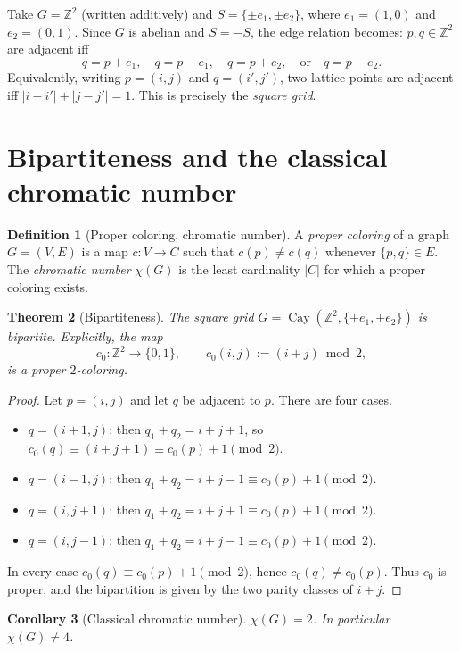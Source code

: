 \documentclass[11pt]{article}
\newtheorem{theorem}{Theorem}
\newtheorem{corollary}[theorem]{Corollary}
\theoremstyle{definition}
\newtheorem{definition}[theorem]{Definition}
\begin{document}
Take $G=\mathbb{Z}^2$ (written additively) and $S=\{\pm e_1,\pm e_2\}$, where
$e_1=(1,0)$ and $e_2=(0,1)$. Since $G$ is abelian and $S=-S$, the edge relation
becomes: $p,q\in\mathbb{Z}^2$ are adjacent iff
\[
q=p+e_1,\quad q=p-e_1,\quad q=p+e_2,\quad\text{or}\quad q=p-e_2.
\]
Equivalently, writing $p=(i,j)$ and $q=(i',j')$, two lattice points are adjacent
iff $|i-i'|+|j-j'|=1$. This is precisely the \emph{square grid}.

\section{Bipartiteness and the classical chromatic number}

\begin{definition}[Proper coloring, chromatic number]
A \emph{proper coloring} of a graph $G=(V,E)$ is a map $c\colon V\to C$ such
that $c(p)\neq c(q)$ whenever $\{p,q\}\in E$. The \emph{chromatic number}
$\chi(G)$ is the least cardinality $|C|$ for which a proper coloring exists.
\end{definition}

\begin{theorem}[Bipartiteness]
\label{thm:bipartite}
The square grid $G=\operatorname{Cay}(\mathbb{Z}^2,\{\pm e_1,\pm e_2\})$ is
bipartite. Explicitly, the map
\[
c_0\colon \mathbb{Z}^2\to\{0,1\},\qquad c_0(i,j) := (i+j)\bmod 2,
\]
is a proper $2$-coloring.
\end{theorem}

\begin{proof}
Let $p=(i,j)$ and let $q$ be adjacent to $p$. There are four cases.
\begin{itemize}
\item $q=(i+1,j)$: then $q_1+q_2 = i+j+1$, so
$c_0(q)\equiv (i+j+1)\equiv c_0(p)+1 \pmod 2$.
\item $q=(i-1,j)$: then $q_1+q_2 = i+j-1\equiv c_0(p)+1 \pmod 2$.
\item $q=(i,j+1)$: then $q_1+q_2=i+j+1\equiv c_0(p)+1\pmod 2$.
\item $q=(i,j-1)$: then $q_1+q_2=i+j-1\equiv c_0(p)+1\pmod 2$.
\end{itemize}
In every case $c_0(q)\equiv c_0(p)+1 \pmod 2$, hence $c_0(q)\neq c_0(p)$. Thus
$c_0$ is proper, and the bipartition is given by the two parity classes of
$i+j$.
\end{proof}

\begin{corollary}[Classical chromatic number]
\label{cor:chi}
$\chi(G)=2$. In particular $\chi(G)\neq 4$.
\end{corollary}
\end{document}
